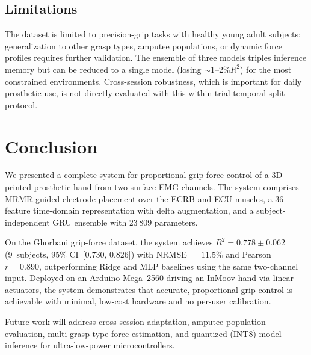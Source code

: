 \documentclass[journal]{IEEEtran}
\begin{document}
\subsection{Limitations}

The dataset is limited to precision-grip tasks with healthy young adult
subjects; generalization to other grasp types, amputee populations, or
dynamic force profiles requires further validation.  The ensemble of three
models triples inference memory but can be reduced to a single model
(losing $\sim$1--2\%$ R^2$) for the most constrained environments.
Cross-session robustness, which is important for daily prosthetic use, is
not directly evaluated with this within-trial temporal split protocol.

\section{Conclusion}
\label{sec:conclusion}

We presented a complete system for proportional grip force control of a
3D-printed prosthetic hand from two surface EMG channels.  The system
comprises MRMR-guided electrode placement over the ECRB and ECU muscles,
a 36-feature time-domain representation with delta augmentation, and a
subject-independent GRU ensemble with 23\,809 parameters.

On the Ghorbani grip-force dataset, the system achieves $R^2 = 0.778
\pm 0.062$ (9~subjects, 95\% CI~[0.730, 0.826]) with NRMSE $= 11.5\%$
and Pearson $r = 0.890$, outperforming Ridge and MLP baselines using the
same two-channel input.  Deployed on an Arduino Mega~2560 driving an
InMoov hand via linear actuators, the system demonstrates that accurate,
proportional grip control is achievable with minimal, low-cost hardware
and no per-user calibration.

Future work will address cross-session adaptation, amputee population
evaluation, multi-grasp-type force estimation, and quantized (INT8)
model inference for ultra-low-power microcontrollers.



\end{document}
